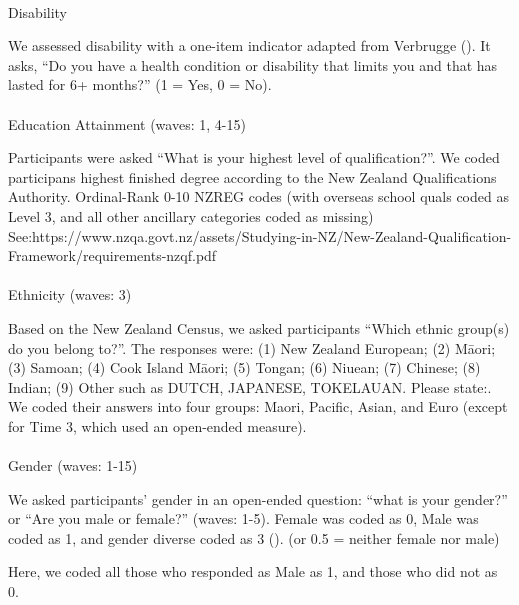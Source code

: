\documentclass[
  singlecolumn]{article}
\makeatletter
\let\oldparagraph\paragraph
\renewcommand{\paragraph}{
    \@ifstar
      \xxxParagraphStar
      \xxxParagraphNoStar
  }
\newcommand{\xxxParagraphStar}[1]{\oldparagraph*{#1}\mbox{}}
\newcommand{\xxxParagraphNoStar}[1]{\oldparagraph{#1}\mbox{}}
\makeatother
\begin{document}
\paragraph{Disability}\label{disability}

We assessed disability with a one-item indicator adapted from Verbrugge
(). It asks, ``Do you have a health
condition or disability that limits you and that has lasted for 6+
months?'' (1 = Yes, 0 = No).

\paragraph{Education Attainment (waves: 1,
4-15)}\label{education-attainment-waves-1-4-15}

Participants were asked ``What is your highest level of
qualification?''. We coded participans highest finished degree according
to the New Zealand Qualifications Authority. Ordinal-Rank 0-10 NZREG
codes (with overseas school quals coded as Level 3, and all other
ancillary categories coded as missing)
See:https://www.nzqa.govt.nz/assets/Studying-in-NZ/New-Zealand-Qualification-Framework/requirements-nzqf.pdf

\paragraph{Ethnicity (waves: 3)}\label{ethnicity-waves-3}

Based on the New Zealand Census, we asked participants ``Which ethnic
group(s) do you belong to?''. The responses were: (1) New Zealand
European; (2) Māori; (3) Samoan; (4) Cook Island Māori; (5) Tongan; (6)
Niuean; (7) Chinese; (8) Indian; (9) Other such as DUTCH, JAPANESE,
TOKELAUAN. Please state:. We coded their answers into four groups:
Maori, Pacific, Asian, and Euro (except for Time 3, which used an
open-ended measure).

\paragraph{Gender (waves: 1-15)}\label{gender-waves-1-15}

We asked participants' gender in an open-ended question: ``what is your
gender?'' or ``Are you male or female?'' (waves: 1-5). Female was coded
as 0, Male was coded as 1, and gender diverse coded as 3
(). (or 0.5
= neither female nor male)

Here, we coded all those who responded as Male as 1, and those who did
not as 0.
\end{document}
